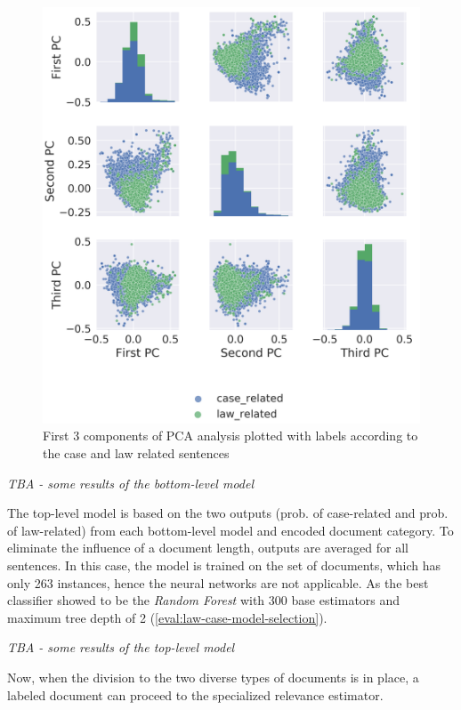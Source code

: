 \documentclass[
  digital, %
  table,   %
  lof,     %
  lot,     %
]{fithesis3}
\begin{document}
\begin{figure}[h]
\caption{First 3 components of PCA analysis plotted with labels according to the case and law related sentences}
\label{fig:PCA_caselaw}
\includegraphics[width=\textwidth]{img/PCA_caselaw}
\end{figure}





\textit{TBA - some results of the bottom-level model}

The top-level model is based on the two outputs (prob. of case-related and prob. of law-related) from each bottom-level model and encoded document category.
To eliminate the influence of a document length, outputs are averaged for all sentences.
In this case, the model is trained on the set of documents, which has only 263 instances, hence the neural networks are not applicable.
As the best classifier showed to be the \textit{Random Forest} with 300 base estimators and maximum tree depth of 2 (\ref{eval:law-case-model-selection}).

\textit{TBA - some results of the top-level model}

Now, when the division to the two diverse types of documents is in place, a labeled document can proceed to the specialized relevance estimator.
\end{document}
